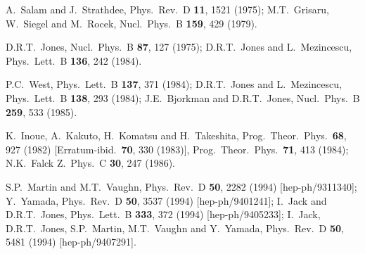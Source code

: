 \documentclass[11pt]{article}
\begin{document}
\begin{thebibliography}{999}
A.~Salam and J.~Strathdee, 
  Phys.\ Rev.\ D {\bf 11}, 1521 (1975);
M.T.~Grisaru, W.~Siegel and M.~Rocek, 
  Nucl.\ Phys.\ B {\bf 159}, 429 (1979).

D.R.T.~Jones,
  Nucl.\ Phys.\ B {\bf 87}, 127 (1975);
D.R.T.~Jones and L.~Mezincescu,
  Phys.\ Lett.\ B {\bf 136}, 242 (1984). 

P.C.~West,
  Phys.\ Lett.\ B {\bf 137}, 371 (1984);
D.R.T.~Jones and L.~Mezincescu,
  Phys.\ Lett.\ B {\bf 138}, 293 (1984);
J.E.~Bjorkman and D.R.T.~Jones,
  Nucl.\ Phys.\ B {\bf 259}, 533 (1985).

K.~Inoue, A.~Kakuto, H.~Komatsu and H.~Takeshita,
  Prog.\ Theor.\ Phys.\  {\bf 68}, 927 (1982)
  [Erratum-ibid.\  {\bf 70}, 330 (1983)],
  Prog.\ Theor.\ Phys.\  {\bf 71}, 413 (1984);
N.K.~Falck 
  Z.\ Phys.\ C {\bf 30}, 247 (1986).

S.P.~Martin and M.T.~Vaughn, 
  Phys.\ Rev.\ D {\bf 50}, 2282 (1994)
  [hep-ph/9311340];
Y.~Yamada, 
  Phys.\ Rev.\ D {\bf 50}, 3537 (1994)
  [hep-ph/9401241];
I.~Jack and D.R.T.~Jones, 
  Phys.\ Lett.\ B {\bf 333}, 372 (1994)
  [hep-ph/9405233];
I.~Jack, D.R.T.~Jones, S.P.~Martin, M.T.~Vaughn and Y.~Yamada, 
  Phys.\ Rev.\ D {\bf 50}, 5481 (1994)
  [hep-ph/9407291].


\end{thebibliography}
\end{document}
